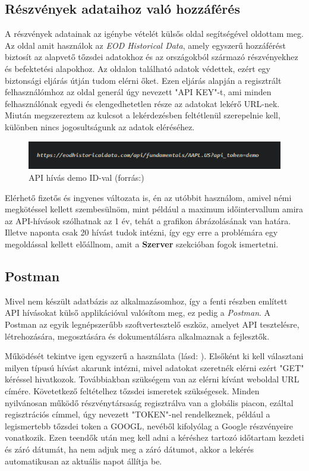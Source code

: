 \subsection{Részvények adataihoz való hozzáférés}

A részvények adatainak az igénybe vételét külsős oldal segítségével oldottam meg. Az oldal amit használok az \emph{EOD Historical Data}, amely egyszerű hozzáférést biztosít az alapvető tőzsdei adatokhoz és az országokból származó részvényekhez és befektetési alapokhoz. Az oldalon található adatok védettek, ezért egy biztonsági eljárás útján tudom elérni őket. Ezen eljárás alapján a regisztrált felhasználómhoz az oldal generál úgy nevezett "API KEY"-t, ami minden felhasználónak egyedi és elengedhetetlen része az adatokat lekérő URL-nek. Miután megszereztem az kulcsot a lekérdezésben feltétlenül szerepelnie kell, különben nincs jogosultságunk az adatok eléréséhez.  \cite{eod} \\

\begin{figure}[h]
\centering
\includegraphics[scale=0.9]{images/demoAPI.png}
\caption{API hívás demo ID-val (forrás:\cite{eod})}
\end{figure}

\pagebreak
	Elérhető fizetős és ingyenes változata is, én az utóbbit használom, amivel némi megkötéssel kellett szembesülnöm, mint például a maximum időintervallum amira az API-hívások szólhatnak az 1 év, tehát a grafikon ábrázolásának van határa. Illetve naponta csak 20 hívást tudok intézni, így egy erre a problémára egy megoldással kellett előállnom, amit a  \textbf{Szerver} szekcióban fogok ismertetni.

\subsection{Postman}

Mivel nem készült adatbázis az alkalmazásomhoz, így a fenti részben említett API hívásokat külső applikációval valósítom meg, ez pedig a \emph{Postman}. A Postman az egyik legnépszerűbb szoftvertesztelő eszköz, amelyet API tesztelésre, létrehozására, megosztására és dokumentálásra alkalmaznak a fejlesztők. 

	Működését tekintve igen egyszerű a használata (lásd: ). Elsőként ki kell választani milyen típusú hívást akarunk intézni, mivel adatokat szeretnék elérni ezért "GET" kéréssel hivatkozok. Továbbiakban szükségem van az elérni kívánt weboldal URL címére. Követetkező feltételhez tőzsdei ismeretek szükségesek. Minden nyilvánosan működő részvénytársaság regisztrálva van a globális piacon, ezáltal regisztrációs címmel, úgy nevezett "TOKEN"-nel rendelkeznek, például a legismertebb tőzsdei token a GOOGL, nevéből kifolyólag a Google részvényeire vonatkozik. Ezen teendők után meg kell adni a kéréshez tartozó időtartam kezdeti és záró dátumát, ha nem adjuk meg a záró dátumot, akkor a lekérés automatikusan az aktuális napot állítja be. 

